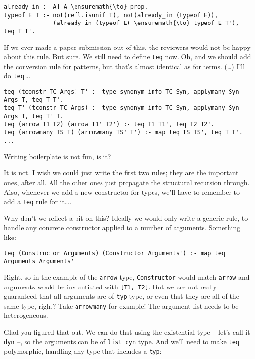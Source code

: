 \begin{verbatim}
already_in : [A] A \ensuremath{\to} prop.
typeof E T :- not(refl.isunif T), not(already_in (typeof E)),
              (already_in (typeof E) \ensuremath{\to} typeof E T'), teq T T'.
\end{verbatim}

\heroSTUDENT{} If we ever made a paper submission out of this, the reviewers
would not be happy about this rule. But sure. We still need to define
\texttt{teq} now. Oh, and we should add the conversion rule for
patterns, but that's almost identical as for terms. (\ldots{}) I'll do
\texttt{teq}\ldots{}.

\begin{verbatim}
teq (tconstr TC Args) T' :- type_synonym_info TC Syn, applymany Syn Args T, teq T T'.
teq T' (tconstr TC Args) :- type_synonym_info TC Syn, applymany Syn Args T, teq T' T.
teq (arrow T1 T2) (arrow T1' T2') :- teq T1 T1', teq T2 T2'.
teq (arrowmany TS T) (arrowmany TS' T') :- map teq TS TS', teq T T'.
...
\end{verbatim}

\heroADVISOR{} Writing boilerplate is not fun, is it?

\heroSTUDENT{} It is not. I wish we could just write the first two rules; they
are the important ones, after all. All the other ones just propagate the
structural recursion through. Also, whenever we add a new constructor
for types, we'll have to remember to add a \texttt{teq} rule for
it\ldots{}.

\heroADVISOR{} Why don't we reflect a bit on this? Ideally we would only write
a generic rule, to handle any concrete constructor applied to a number
of arguments. Something like:

\begin{verbatim}
teq (Constructor Arguments) (Constructor Arguments') :- map teq Arguments Arguments'.
\end{verbatim}

\heroSTUDENT{} Right, so in the example of the \texttt{arrow} type,
\texttt{Constructor} would match \texttt{arrow} and arguments would be
instantiated with \texttt{{[}T1,\ T2{]}}. But we are not really
guaranteed that all arguments are of \texttt{typ} type, or even that
they are all of the same type, right? Take \texttt{arrowmany} for
example! The argument list needs to be heterogeneous.

\heroADVISOR{} Glad you figured that out. We can do that using the existential
type -- let's call it \texttt{dyn} --, so the arguments can be of
\texttt{list\ dyn} type. And we'll need to make \texttt{teq}
polymorphic, handling any type that includes a \texttt{typ}:

